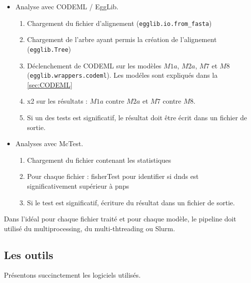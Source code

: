 \documentclass[../main]{subfiles} %
\begin{document}
\begin{itemize}
    \item Analyse avec \gls{CODEML} / \gls{EggLib}.  
    \begin{enumerate}
        \item Chargement du fichier d'alignement (\lstinline{egglib.io.from_fasta})
        \item Chargement de l'arbre ayant permis la création de l'alignement (\lstinline{egglib.Tree})
        \item Déclenchement de \gls{CODEML} sur les modèles $M1a$, $M2a$, $M7$ et $M8$  (\lstinline{egglib.wrappers.codeml}). Les modéles sont expliqués dans la  \cref{sec:CODEML}
        \item \Gls{x2} sur les résultats : $M1a$ contre $M2a$ et $M7$ contre $M8$.
        \item Si un des tests est significatif, le résultat doit être écrit dans un fichier de sortie.
    \end{enumerate}
    
    \item Analyses avec \gls{McTest}.
        \begin{enumerate}
        \item Chargement du fichier contenant les statistiques 
        \item Pour chaque fichier : \gls{fisherTest} pour identifier si \acrshort{dnds} est significativement supérieur à \acrshort{pnps}
        \item Si le test est significatif, écriture du résultat dans un fichier de sortie.
    \end{enumerate}
\end{itemize}

Dans l'idéal pour chaque fichier traité et pour chaque modèle, le pipeline doit utilisé du multiprocessing, du multi-thtreading ou \gls{Slurm}.

\subsection{Les outils}

Présentons succinctement les logiciels utilisés.
\end{document}
